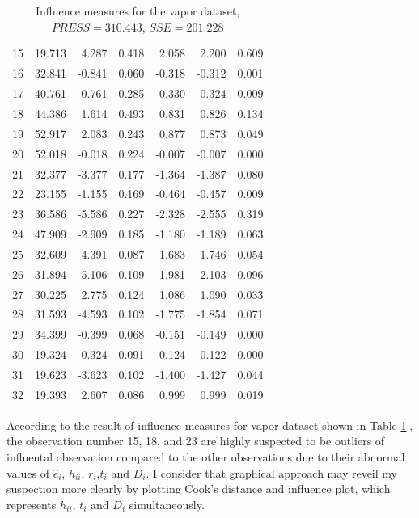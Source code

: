 \documentclass[12pt]{article} %
\begin{document}
\begin{enumerate}
\begin{itemize}
\begin{table}[ht]
\begin{center}
\begin{tabular}{rrrrrrr}
  15 & 19.713 & 4.287 & 0.418 & 2.058 & 2.200 & 0.609 \\ 
  16 & 32.841 & -0.841 & 0.060 & -0.318 & -0.312 & 0.001 \\ 
  17 & 40.761 & -0.761 & 0.285 & -0.330 & -0.324 & 0.009 \\ 
  18 & 44.386 & 1.614 & 0.493 & 0.831 & 0.826 & 0.134 \\ 
  19 & 52.917 & 2.083 & 0.243 & 0.877 & 0.873 & 0.049 \\ 
  20 & 52.018 & -0.018 & 0.224 & -0.007 & -0.007 & 0.000 \\ 
  21 & 32.377 & -3.377 & 0.177 & -1.364 & -1.387 & 0.080 \\ 
  22 & 23.155 & -1.155 & 0.169 & -0.464 & -0.457 & 0.009 \\ 
  23 & 36.586 & -5.586 & 0.227 & -2.328 & -2.555 & 0.319 \\ 
  24 & 47.909 & -2.909 & 0.185 & -1.180 & -1.189 & 0.063 \\ 
  25 & 32.609 & 4.391 & 0.087 & 1.683 & 1.746 & 0.054 \\ 
  26 & 31.894 & 5.106 & 0.109 & 1.981 & 2.103 & 0.096 \\ 
  27 & 30.225 & 2.775 & 0.124 & 1.086 & 1.090 & 0.033 \\ 
  28 & 31.593 & -4.593 & 0.102 & -1.775 & -1.854 & 0.071 \\ 
  29 & 34.399 & -0.399 & 0.068 & -0.151 & -0.149 & 0.000 \\ 
  30 & 19.324 & -0.324 & 0.091 & -0.124 & -0.122 & 0.000 \\ 
  31 & 19.623 & -3.623 & 0.102 & -1.400 & -1.427 & 0.044 \\ 
  32 & 19.393 & 2.607 & 0.086 & 0.999 & 0.999 & 0.019 \\ 
   \hline
\end{tabular}
\caption{Influence measures for the vapor dataset, $PRESS=310.443$, $SSE=201.228$\label{infltbl}}
\end{center}
\end{table}
	According to the result of influence measures for vapor dataset shown in Table \ref{infltbl}., 
	the observation number 15, 18, and 23 are highly suspected to be outliers of influental observation compared to
	the other observations due to their abnormal values of $\hat{e}_{i}$, $h_{ii}$, $r_{i}$,$t_{i}$ and $D_{i}$. 
	I consider that graphical approach may reveil my suspection more clearly by plotting Cook's distance and 
	influence plot, which represents $h_{ii}$, $t_{i}$ and $D_{i}$ simultaneously.   
\begin{figure}[!ht]

\end{figure}
\end{itemize}
\end{enumerate}
\end{document}
